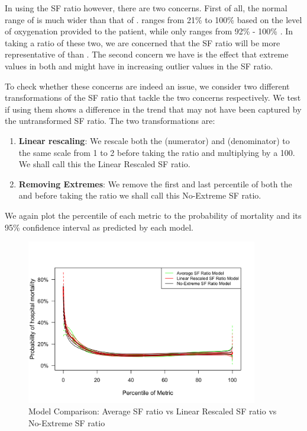 In using the SF ratio however, there are two concerns. First of all, the normal range of \Fi is much wider than that of \Sp. \Fi ranges from 21\% to 100\% based on the level of oxygenation provided to the patient, while \Sp only ranges from 92\% - 100\% \citep{lapum2018vital}. In taking a ratio of these two, we are concerned that the SF ratio will be more representative of \Fi than \Sp. The second concern we have is the effect that extreme values in both \Sp and \Fi might have in increasing outlier values in the SF ratio.

To check whether these concerns are indeed an issue, we consider two different transformations of the SF ratio that tackle the two concerns respectively. We test if using them shows a difference in the trend that may not have been captured by the untransformed SF ratio. The two transformations are:

\begin{enumerate}
	\item \textbf{Linear rescaling}: We rescale both the \Sp (numerator) and \Fi (denominator) to the same scale from 1 to 2 before taking the ratio and multiplying by a 100. We shall call this the Linear Rescaled SF ratio. 
	\item \textbf{Removing Extremes}: We remove the first and last percentile of 
	both the \Sp and \Fi before taking the ratio we shall call this No-Extreme SF ratio. 
\end{enumerate} 

We again plot the percentile of each metric to the probability of mortality and its 95\% confidence interval as predicted by each model. 

\begin{figure}[H]
	\centering
	\includegraphics[width=0.9\textwidth]{figures/doestransformationhelp-4.png}
	\caption{Model Comparison: Average SF ratio vs Linear Rescaled SF ratio vs No-Extreme SF ratio}
	\label{fig:toratioornot}
\end{figure}


